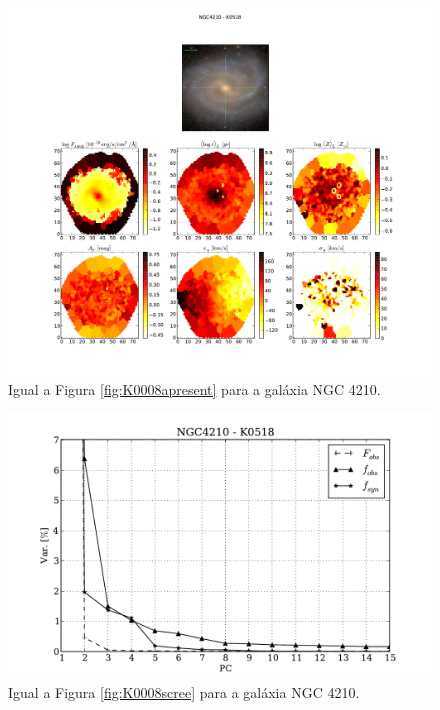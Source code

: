 \begin{figure}
    \includegraphics[width=1.\textwidth]{figuras/K0518-apresent.pdf}
    \caption[Propriedades f\'isicas da gal\'axia NGC 4210.]
    {Igual a Figura \ref{fig:K0008apresent} para a galáxia NGC 4210.}
    \label{fig:K0518apresent}
\end{figure}

\begin{figure}
    \includegraphics[height=0.33\textheight]{figuras/K0518-screetest.pdf}
    \caption[Scree test comparativo entre 3 PCAs - NGC 4210.]
	{Igual a Figura \ref{fig:K0008scree} para a galáxia NGC 4210.}
    \label{fig:K0518scree}
\end{figure}

